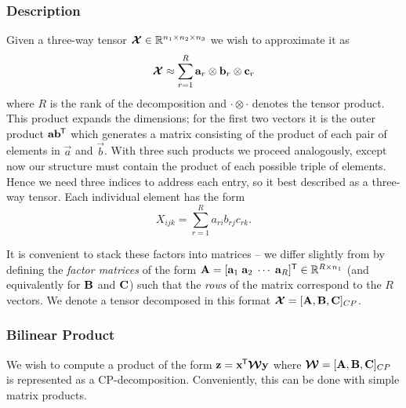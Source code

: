 {\subsubsection{Description}
Given a three-way tensor \(\bm{\mathcal{X}} \in \mathbb{R}^{n_1 \times n_2 \times n_3}\) we wish to 
approximate it as
\begin{equation}\label{eq:cp-statement}
	\bm{\mathcal{X}} \approx \sum_{r=1}^{R} \mathbf{a}_r \otimes \mathbf{b}_r \otimes \mathbf{c}_r
\end{equation}
 where \(R\) is the rank of the decomposition and \(\cdot \otimes \cdot\) denotes the tensor
product. This product expands the dimensions; for the first two vectors it is the outer product
\(\mathbf{a}\mathbf{b}^{\mkern-1.5mu\mathsf{T}}\) which generates a matrix consisting of the product of each pair of
elements in \(\vec{a}\) and \(\vec{b}\). With three such products we proceed analogously, except
now our structure must contain the product of each possible triple of elements. Hence we need
three indices to address each entry, so it best described as a three-way tensor. Each individual
element has the form
\begin{equation}\label{eq:cp-element}
	X_{ijk} = \sum_{r=1}^R a_{ri}b_{rj}c_{rk}.
\end{equation}

It is convenient to stack these factors into matrices --
we differ slightly from \autocite{Kolda2009} by defining the \textit{factor matrices} of the 
form \(\mathbf{A} = [\mathbf{a}_1\;\mathbf{a}_2\;\cdots\;\mathbf{a}_R]^{\mathsf{T}} \in 
\mathbb{R}^{R\times n_1}\) (and equivalently for
\(\mathbf{B}\) and \(\mathbf{C}\)) such that the  \textit{rows} of the matrix correspond to the
\(R\) vectors. 
We denote a tensor decomposed in this format 
\(\bm{\mathcal{X}} = [\mathbf{A}, \mathbf{B}, \mathbf{C}]_{CP}\).

\subsubsection{Bilinear Product}
We wish to compute a product of the form \(\mathbf{z} = \mathbf{x}^{\mkern-1.5mu\mathsf{T}}\bm{\mathcal{W}}\mathbf{y}\)
where \(\bm{\mathcal{W}} = [\mathbf{A}, \mathbf{B}, \mathbf{C}]_{CP}\) is represented as a CP-decomposition.
Conveniently, this can be done with simple matrix products.

}
